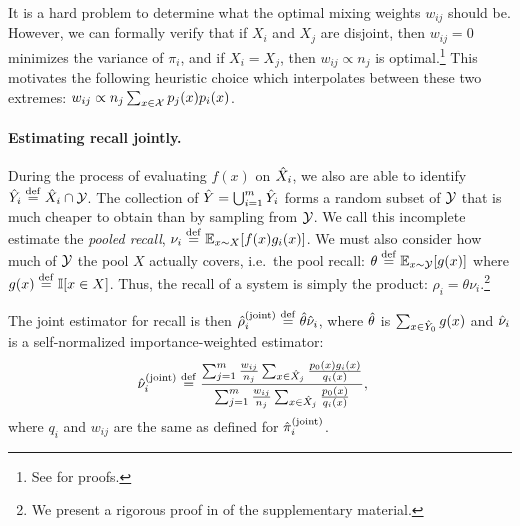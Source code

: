It is a hard problem to determine what the optimal mixing weights $w_{ij}$ should be.
However, we can formally verify that 
  if $X_i$ and $X_j$ are disjoint, then $w_{ij} = 0$ minimizes the variance of $\pi_i$,
  and if $X_i = X_j$, then $w_{ij} \propto n_{j}$ is optimal.\footnote{%
  See  for proofs.}
This motivates the following heuristic choice which interpolates between these two extremes:
$w_{ij} \propto n_{j} \sum_{x \in \mathcal{X}} p_j(x) p_i(x)$.

\paragraph{Estimating recall jointly.}
During the process of evaluating $f(x)$ on ${\hat{X}}_i$, we also are able to identify ${\hat{Y}}_i \stackrel{\rm def}{=} {\hat{X}}_i \cap \mathcal{Y}$.
The collection of ${\hat{Y}} = \bigcup_{i=1}^m {\hat{Y}}_i$ forms a random subset of $\mathcal{Y}$ that is much cheaper to obtain than by sampling from $\mathcal{Y}$.
We call this incomplete estimate the \emph{pooled recall},
$\nu_i \stackrel{\rm def}{=} \mathbb{E}_{x \sim X}[f(x) g_i(x)]$.
We must also consider how much of $\mathcal{Y}$ the pool $X$ actually covers, i.e.\ the pool recall: $\theta \stackrel{\rm def}{=} \mathbb{E}_{x \sim \mathcal{Y}}[g(x)]$ where $g(x) \stackrel{\rm def}{=} \mathbb{I}[x \in X]$.
Thus, the recall of a system is simply the product: $\rho_i = \theta \nu_i$.\footnote{%
We present a rigorous proof in  of the supplementary material.}

The joint estimator for recall is then ${\hat{\rho}}_i^{\text{(joint)}} \stackrel{\rm def}{=} {\hat{\theta}}{\hat{\nu}}_i$, where ${\hat{\theta}}$ is $\sum_{x \in {\hat{Y}}_0} g(x)$ and ${\hat{\nu}}_i$ is a self-normalized importance-weighted estimator:
\begin{align*}
  {\hat{\nu}}_i^{\text{(joint)}} &\stackrel{\rm def}{=} \frac{\sum_{j=1}^m \frac{w_{ij}}{n_j} \sum_{x \in {\hat{X}}_j} \frac{p_0(x) g_i(x)}{q_i(x)}}{\sum_{j=1}^m \frac{w_{ij}}{n_j} \sum_{x \in {\hat{X}}_j} \frac{p_0(x)}{q_i(x)}},
\end{align*}
where $q_i$ and $w_{ij}$ are the same as defined for ${\hat{\pi}}_i^{\text{(joint)}}$.

